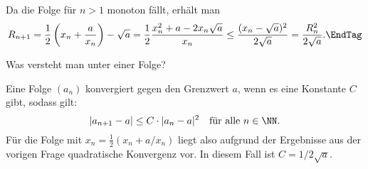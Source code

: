 \begin{antwort}
  Da die Folge für $n>1$ monoton fällt, erhält man
  \begin{equation}
    R_{n+1} = \frac{1}{2} \left( x_n + \frac{a}{x_n} \right) - \sqrt{a} = 
    \frac{1}{2}  \frac{ x_n^2 + a-2x_n \sqrt{a} }{ x_n } \le 
    \frac{ ( x_n-\sqrt{a} )^2 }{ 2\sqrt{a} } = \frac{R_n^2}{2\sqrt{a}}.
    \EndTag
  \end{equation}
\end{antwort}

\begin{frage}%
  \label{02_quak}
  Was versteht man unter  einer Folge?
\end{frage}

\begin{antwort}
  Eine Folge $(a_n)$ konvergiert  gegen 
  den Grenzwert $a$, wenn es eine Konstante 
  $C$ gibt, sodass gilt:
  \[
  |a_{n+1}-a| \le C \cdot |a_n-a|^2\quad\text{für alle $n\in\NN$}.
  \]
  Für die Folge mit $x_n=\frac{1}{2}( x_n + a/x_n)$ liegt also aufgrund 
  der Ergebnisse aus der vorigen Frage quadratische Konvergenz vor. 
  In diesem Fall ist $C=1/2\sqrt{a}$. 
  \AntEnd
\end{antwort}


